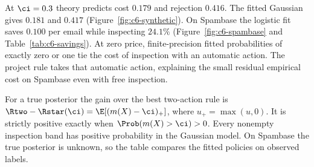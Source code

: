 At $\ci=0.3$ theory predicts cost $0.179$ and rejection $0.416$. The fitted Gaussian
gives $0.181$ and $0.417$ (Figure~\ref{fig:c6-synthetic}). On Spambase the logistic fit
saves $0.100$ per email while inspecting $24.1\%$ (Figure~\ref{fig:c6-spambase} and Table~\ref{tab:c6-savings}).
At zero price, finite-precision fitted probabilities of exactly zero or one tie the cost of
inspection with an automatic action. The project rule takes that automatic action, explaining
the small residual empirical cost on Spambase even with free inspection.

For a true posterior the gain over the best two-action rule is
$\Rtwo-\Rstar(\ci)=\E[(m(X)-\ci)_+]$, where $u_+=\max(u,0)$.
It is strictly positive exactly when $\Prob(m(X)>\ci)>0$. Every nonempty inspection
band has positive probability in the Gaussian model. On Spambase the true posterior is unknown,
so the table compares the fitted policies on observed labels.
